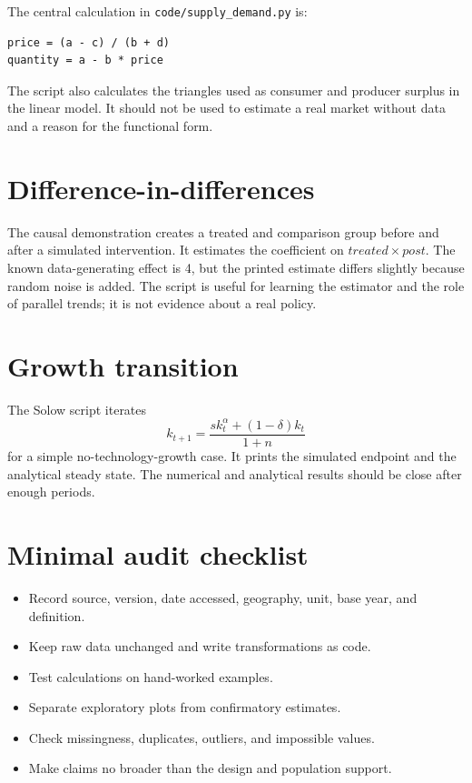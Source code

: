 \documentclass[11pt,oneside,openany]{book}
\begin{document}
The central calculation in \texttt{code/supply\_demand.py} is:

\begin{lstlisting}
price = (a - c) / (b + d)
quantity = a - b * price
\end{lstlisting}

The script also calculates the triangles used as consumer and producer surplus in the linear model. It should not be used to estimate a real market without data and a reason for the functional form.

\section{Difference-in-differences}

The causal demonstration creates a treated and comparison group before and after a simulated intervention. It estimates the coefficient on $treated\times post$. The known data-generating effect is 4, but the printed estimate differs slightly because random noise is added. The script is useful for learning the estimator and the role of parallel trends; it is not evidence about a real policy.

\section{Growth transition}

The Solow script iterates
\[
  k_{t+1}=\frac{s k_t^\alpha+(1-\delta)k_t}{1+n}
\]
for a simple no-technology-growth case. It prints the simulated endpoint and the analytical steady state. The numerical and analytical results should be close after enough periods.

\section{Minimal audit checklist}

\begin{itemize}
  \item Record source, version, date accessed, geography, unit, base year, and definition.
  \item Keep raw data unchanged and write transformations as code.
  \item Test calculations on hand-worked examples.
  \item Separate exploratory plots from confirmatory estimates.
  \item Check missingness, duplicates, outliers, and impossible values.
  \item Make claims no broader than the design and population support.
\end{itemize}
\end{document}
